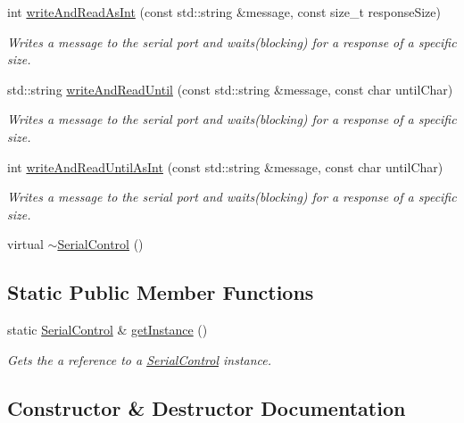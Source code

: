 \begin{DoxyCompactItemize}
int \hyperlink{class_serial_control_a7632975d1edf2685411a4c7988f1941e}{write\+And\+Read\+As\+Int} (const std\+::string \&message, const size\+\_\+t response\+Size)
\begin{DoxyCompactList}\small\item\em Writes a message to the serial port and waits(blocking) for a response of a specific size. \end{DoxyCompactList}\item 
std\+::string \hyperlink{class_serial_control_a4e637cd5cf3bf8cc13d6b9852d0a891c}{write\+And\+Read\+Until} (const std\+::string \&message, const char until\+Char)
\begin{DoxyCompactList}\small\item\em Writes a message to the serial port and waits(blocking) for a response of a specific size. \end{DoxyCompactList}\item 
int \hyperlink{class_serial_control_aad283042dd26b2be94d78ac45c629751}{write\+And\+Read\+Until\+As\+Int} (const std\+::string \&message, const char until\+Char)
\begin{DoxyCompactList}\small\item\em Writes a message to the serial port and waits(blocking) for a response of a specific size. \end{DoxyCompactList}\item 
virtual \hyperlink{class_serial_control_a7a32ed21557bb9a0c92806d57435e5a3}{$\sim$\+Serial\+Control} ()
\end{DoxyCompactItemize}
\subsection*{Static Public Member Functions}
\begin{DoxyCompactItemize}
\item 
static \hyperlink{class_serial_control}{Serial\+Control} \& \hyperlink{class_serial_control_a5947ac36625386032cfce8deb07b65a9}{get\+Instance} ()
\begin{DoxyCompactList}\small\item\em Gets the a reference to a \hyperlink{class_serial_control}{Serial\+Control} instance. \end{DoxyCompactList}\end{DoxyCompactItemize}


\subsection{Constructor \& Destructor Documentation}
